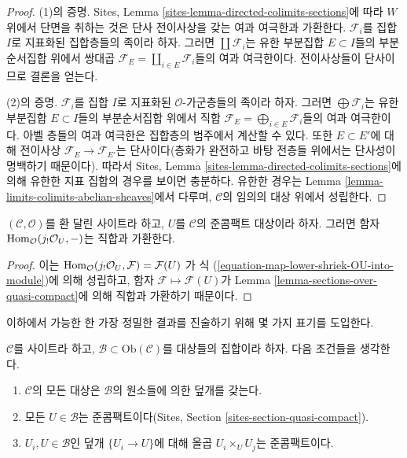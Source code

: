 \begin{proof}
(1)의 증명. Sites, Lemma
\ref{sites-lemma-directed-colimits-sections}에 따라 $W$ 위에서 단면을 취하는
것은 단사 전이사상을 갖는 여과 여극한과 가환한다. $\mathcal{F}_i$를 집합
$I$로 지표화된 집합층들의 족이라 하자. 그러면 $\coprod \mathcal{F}_i$는
유한 부분집합 $E \subset I$들의 부분순서집합 위에서 쌍대곱
$\mathcal{F}_E = \coprod_{i \in E} \mathcal{F}_i$들의 여과 여극한이다.
전이사상들이 단사이므로 결론을 얻는다.

\medskip\noindent
(2)의 증명. $\mathcal{F}_i$를 집합 $I$로 지표화된 $\mathcal{O}$-가군층들의
족이라 하자. 그러면 $\bigoplus \mathcal{F}_i$는 유한 부분집합
$E \subset I$들의 부분순서집합 위에서 직합
$\mathcal{F}_E = \bigoplus_{i \in E} \mathcal{F}_i$들의 여과 여극한이다.
아벨 층들의 여과 여극한은 집합층의 범주에서 계산할 수 있다. 또한
$E \subset E'$에 대해 전이사상 $\mathcal{F}_E \to \mathcal{F}_{E'}$는
단사이다(층화가 완전하고 바탕 전층들 위에서는 단사성이 명백하기 때문이다).
따라서 Sites, Lemma \ref{sites-lemma-directed-colimits-sections}에 의해 유한한
지표 집합의 경우를 보이면 충분하다. 유한한 경우는 Lemma
\ref{lemma-limits-colimits-abelian-sheaves}에서 다루며, $\mathcal{C}$의 임의의
대상 위에서 성립한다.
\end{proof}

\begin{lemma}
\label{lemma-quasi-compact-hom-from}
$(\mathcal{C}, \mathcal{O})$를 환 달린 사이트라 하고, $U$를 $\mathcal{C}$의
준콤팩트 대상이라 하자. 그러면 함자
$\mathop{\mathrm{Hom}}\nolimits_\mathcal{O}(j_!\mathcal{O}_U, -)$는 직합과 가환한다.
\end{lemma}

\begin{proof}
이는
$\mathop{\mathrm{Hom}}\nolimits_\mathcal{O}(j_!\mathcal{O}_U, \mathcal{F}) = \mathcal{F}(U)$
가 식 (\ref{equation-map-lower-shriek-OU-into-module})에 의해 성립하고, 함자
$\mathcal{F} \mapsto \mathcal{F}(U)$가 Lemma
\ref{lemma-sections-over-quasi-compact}에 의해 직합과 가환하기 때문이다.
\end{proof}

\noindent
이하에서 가능한 한 가장 정밀한 결과를 진술하기 위해 몇 가지 표기를
도입한다.

\begin{situation}
\label{situation-quasi-compact-objects}
$\mathcal{C}$를 사이트라 하고,
$\mathcal{B} \subset \text{Ob}(\mathcal{C})$를 대상들의 집합이라 하자.
다음 조건들을 생각한다.
\begin{enumerate}
\item
\label{item-enough}
$\mathcal{C}$의 모든 대상은 $\mathcal{B}$의 원소들에 의한 덮개를 갖는다.
\item
\label{item-enough-qc}
모든 $U \in \mathcal{B}$는 준콤팩트이다(Sites, Section
\ref{sites-section-quasi-compact}).
\item
\label{item-enough-qc-qs}
$U_i, U \in \mathcal{B}$인 덮개 $\{U_i \to U\}$에 대해 올곱
$U_i \times_U U_j$는 준콤팩트이다.
\end{enumerate}
\end{situation}

